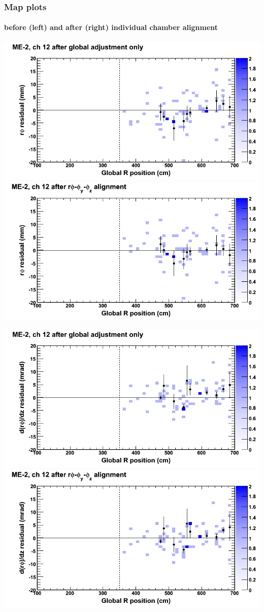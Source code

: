 \documentclass[compress]{beamer}
\begin{document}
\begin{frame}
\frametitle{Map plots}
\framesubtitle{before (left) and after (right) individual chamber alignment}
\includegraphics[width=0.5\linewidth]{ringmapplots_3dof/before_CSCvsr_mem2ch12_x.png} \includegraphics[width=0.5\linewidth]{ringmapplots_3dof/after_CSCvsr_mem2ch12_x.png}

\includegraphics[width=0.5\linewidth]{ringmapplots_3dof/before_CSCvsr_mem2ch12_dxdz.png} \includegraphics[width=0.5\linewidth]{ringmapplots_3dof/after_CSCvsr_mem2ch12_dxdz.png}
\end{frame}
\end{document}
